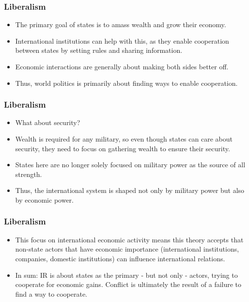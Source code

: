 \documentclass[handout]{beamer}
\begin{document}
\begin{frame} 
\frametitle{\LARGE{Liberalism}}
    \begin{itemize}
    	\item The primary goal of states is to amass wealth and grow their economy. \pause
    	\item International institutions can help with this, as they enable cooperation between states by setting rules and sharing information. \pause
        \item Economic interactions are generally about making both sides better off. \pause
        \item Thus, world politics is primarily about finding ways to enable cooperation. 
 \end{itemize}
\end{frame}

\begin{frame} 
	\frametitle{\LARGE{Liberalism}}
	\begin{itemize}
	   \item What about security? \pause
	   \item Wealth is required for any military, so even though states can care about security, they need to focus on gathering wealth to ensure their security.  \pause
	   \item States here are no longer solely focused on military power as the source of all strength. \pause
	   \item Thus, the international system is shaped not only by military power but also by economic power.  
	\end{itemize}
\end{frame}

\begin{frame} 
\frametitle{\LARGE{Liberalism}}
\begin{itemize}
	\item This focus on international economic activity means this theory accepts that non-state actors that have economic importance (international institutions, companies, domestic institutions) can influence international relations. \pause
	\item In sum: IR is about states as the primary - but not only - actors, trying to cooperate for economic gains. Conflict is ultimately the result of a failure to find a way to cooperate. 
\end{itemize}
\end{frame}
\end{document}

